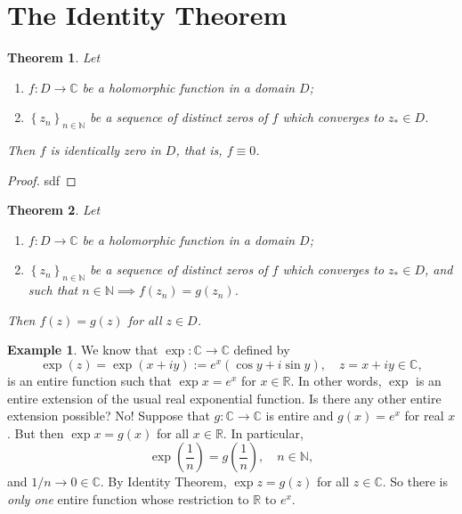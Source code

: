 \documentclass[12pt,openany]{book}
\newtheorem{theorem}{Theorem}[chapter]
\theoremstyle{definition}
\newtheorem{example}{Example}[section]
\newcommand{\set}[1]{\left\{#1\right\}}
\newcommand{\N}{\mathbb{N}}
\newcommand{\R}{\mathbb{R}}
\newcommand{\C}{\mathbb{C}}
\newcommand{\of}[1]{\left( #1 \right)}
\begin{document}
	\section{The Identity Theorem}
	
	\begin{tcolorbox}[colback=white,colframe=thmcolor,arc=5pt,title={\color{white}\bf }]
		\begin{theorem}
			Let \begin{enumerate}[(1)]
				\item $f:D\to\C$ be a holomorphic function in a domain $D$;
				\item $\set{z_n}_{n\in\N}$ be a sequence of distinct zeros of $f$ which converges to $z_*\in D$.
			\end{enumerate} Then $f$ is identically zero in $D$, that is, $f\equiv 0$.
		\end{theorem}
	\end{tcolorbox}
	\begin{proof}
		sdf
	\end{proof}
	\vspace{4pt}
	\begin{tcolorbox}[colback=white,colframe=corcolor,arc=5pt,title={\color{white}\bf Identity Theorem}]
		\begin{theorem}
			Let \begin{enumerate}[(1)]
				\item $f:D\to\C$ be a holomorphic function in a domain $D$;
				\item $\set{z_n}_{n\in\N}$ be a sequence of distinct zeros of $f$ which converges to $z_*\in D$, and such that $n\in\N\implies f(z_n)=g(z_n)$.
			\end{enumerate} Then $f(z)=g(z)$ for all $z\in D$.
		\end{theorem}
	\end{tcolorbox}
	\vspace{8pt}
	\begin{example}
		We know that $\exp:\C\to\C$ defined by \[
		\exp (z)=\exp(x+iy):=e^x\of{\cos y+i\sin y},\quad z=x+iy\in\C,
		\] is an entire function such that $\exp x=e^x$ for $x\in\R$. In other words, $\exp$ is an entire extension of the usual real exponential function. Is there any other entire extension possible? No! Suppose that $g:\C\to\C$ is entire and $g(x)=e^x$ for real $x$. But then $\exp x=g(x)$ for all $x\in\R$. In particular, \[
		\exp\of{\frac{1}{n}}=g\of{\frac{1}{n}},\quad n\in\N,
		\] and $1/n\to 0\in\C$. By Identity Theorem, $\exp z=g(z)$ for all $z\in\C$. So there is \textit{only one} entire function whose restriction to $\R$ to $e^x$.
	\end{example}
	
\end{document}
